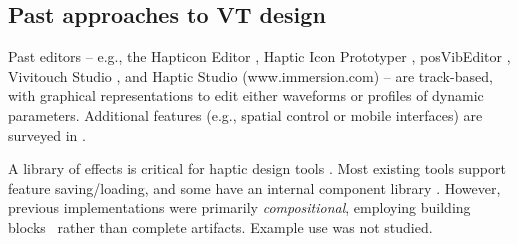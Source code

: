 
\subsection{Past approaches to VT design}
Past editors -- e.g., the Hapticon Editor \cite{Enriquez2003}, Haptic Icon Prototyper \cite{Swindells2006}, posVibEditor \cite{Ryu2008}, Vivitouch Studio \cite{Swindells2014}, and Haptic Studio (www.immersion.com) -- are track-based, with graphical representations to edit either waveforms or profiles of dynamic parameters.
Additional features (e.g., spatial control or mobile interfaces) are surveyed in \cite{Schneider2015}.

A library of effects is critical for haptic design tools \cite{Schneider2015}. Most existing tools support feature saving/loading, and some have an internal component library \cite{Enriquez2003,Swindells2006,Swindells2014}.
However, previous implementations were primarily \emph{compositional}, employing building blocks~\cite{Enriquez2006} %
rather than complete artifacts. Example use was not studied.

